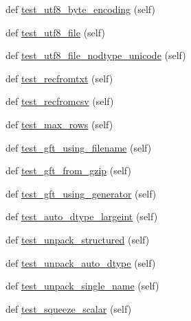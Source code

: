 \begin{DoxyCompactItemize}
def \hyperlink{classnumpy_1_1lib_1_1tests_1_1test__io_1_1TestFromTxt_a874f6d59c630829db6141e90024ea151}{test\+\_\+utf8\+\_\+byte\+\_\+encoding} (self)
\item 
def \hyperlink{classnumpy_1_1lib_1_1tests_1_1test__io_1_1TestFromTxt_ab0c34f810ba6ea16bf510b1afcde8571}{test\+\_\+utf8\+\_\+file} (self)
\item 
def \hyperlink{classnumpy_1_1lib_1_1tests_1_1test__io_1_1TestFromTxt_af0f54f9e69894f79239536404e20fddc}{test\+\_\+utf8\+\_\+file\+\_\+nodtype\+\_\+unicode} (self)
\item 
def \hyperlink{classnumpy_1_1lib_1_1tests_1_1test__io_1_1TestFromTxt_a4aabca7882dec231c4fbf80fc5aa3b36}{test\+\_\+recfromtxt} (self)
\item 
def \hyperlink{classnumpy_1_1lib_1_1tests_1_1test__io_1_1TestFromTxt_a7ab1d2477632218ba988b165448b2078}{test\+\_\+recfromcsv} (self)
\item 
def \hyperlink{classnumpy_1_1lib_1_1tests_1_1test__io_1_1TestFromTxt_a5d17418e103c39d2300ad80e18448023}{test\+\_\+max\+\_\+rows} (self)
\item 
def \hyperlink{classnumpy_1_1lib_1_1tests_1_1test__io_1_1TestFromTxt_a3b7e01b841080c8bda78ddf73253fa5d}{test\+\_\+gft\+\_\+using\+\_\+filename} (self)
\item 
def \hyperlink{classnumpy_1_1lib_1_1tests_1_1test__io_1_1TestFromTxt_a0d00bf51a4830c8e0da37864e4f0a3f9}{test\+\_\+gft\+\_\+from\+\_\+gzip} (self)
\item 
def \hyperlink{classnumpy_1_1lib_1_1tests_1_1test__io_1_1TestFromTxt_a9fc131f1b768239d539898312001cee2}{test\+\_\+gft\+\_\+using\+\_\+generator} (self)
\item 
def \hyperlink{classnumpy_1_1lib_1_1tests_1_1test__io_1_1TestFromTxt_afe3103971b2081c3483a5ab9e0dfc358}{test\+\_\+auto\+\_\+dtype\+\_\+largeint} (self)
\item 
def \hyperlink{classnumpy_1_1lib_1_1tests_1_1test__io_1_1TestFromTxt_aaa78889fe5a184b988a3065deaa0dcd5}{test\+\_\+unpack\+\_\+structured} (self)
\item 
def \hyperlink{classnumpy_1_1lib_1_1tests_1_1test__io_1_1TestFromTxt_a195cd6fd643de7099d34ae390c8e8c6e}{test\+\_\+unpack\+\_\+auto\+\_\+dtype} (self)
\item 
def \hyperlink{classnumpy_1_1lib_1_1tests_1_1test__io_1_1TestFromTxt_aba44f68ed2c2e80ae5fd5b5f9d67156c}{test\+\_\+unpack\+\_\+single\+\_\+name} (self)
\item 
def \hyperlink{classnumpy_1_1lib_1_1tests_1_1test__io_1_1TestFromTxt_a02a55ee8316bad309e3ee6d29f24264e}{test\+\_\+squeeze\+\_\+scalar} (self)
\end{DoxyCompactItemize}
